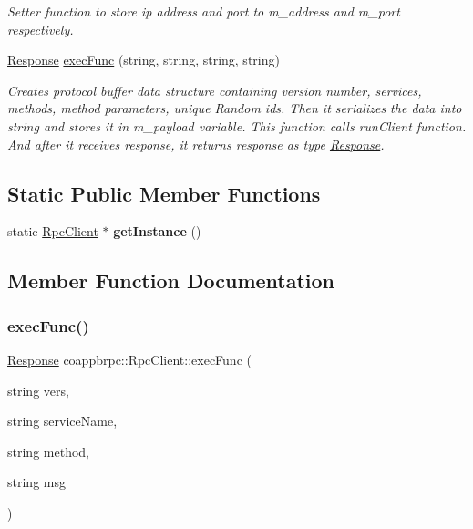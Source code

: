 \begin{DoxyCompactItemize}
\begin{DoxyCompactList}\small\item\em Setter function to store ip address and port to m\+\_\+address and m\+\_\+port respectively. \end{DoxyCompactList}\item 
\hyperlink{classcoappbrpc_1_1Response}{Response} \hyperlink{classcoappbrpc_1_1RpcClient_afe2dc0caa49442db4898379d040c8b64}{exec\+Func} (string, string, string, string)
\begin{DoxyCompactList}\small\item\em Creates protocol buffer data structure containing version number, services, methods, method parameters, unique Random ids. Then it serializes the data into string and stores it in m\+\_\+payload variable. This function calls run\+Client function. And after it receives response, it returns response as type \hyperlink{classcoappbrpc_1_1Response}{Response}. \end{DoxyCompactList}\end{DoxyCompactItemize}
\subsection*{Static Public Member Functions}
\begin{DoxyCompactItemize}
\item 
\mbox{\label{classcoappbrpc_1_1RpcClient_a36bb0e75fae00e4ea9e643d8c1b16f5c}} 
static \hyperlink{classcoappbrpc_1_1RpcClient}{Rpc\+Client} $\ast$ {\bfseries get\+Instance} ()
\end{DoxyCompactItemize}


\subsection{Member Function Documentation}
\mbox{\label{classcoappbrpc_1_1RpcClient_afe2dc0caa49442db4898379d040c8b64}} 
\subsubsection{\texorpdfstring{exec\+Func()}{execFunc()}}
{\footnotesize\ttfamily \hyperlink{classcoappbrpc_1_1Response}{Response} coappbrpc\+::\+Rpc\+Client\+::exec\+Func (\begin{DoxyParamCaption}\item[{string}]{vers,  }\item[{string}]{service\+Name,  }\item[{string}]{method,  }\item[{string}]{msg }\end{DoxyParamCaption})}



